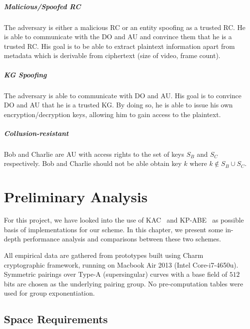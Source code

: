 \documentclass[hyp,a4paper,12pt,openbib]{socreport}
\begin{document}
\paragraph{Malicious/Spoofed RC} The adversary is either a malicious RC or an entity spoofing as a trusted RC. He is able to communicate with the DO and AU and convince them that he is a trusted RC. His goal is to be able to extract plaintext information apart from metadata which is derivable from ciphertext (size of video, frame count). 

\paragraph{KG Spoofing} The adversary is able to communicate with DO and AU. His goal is to convince DO and AU that he is a trusted KG. By doing so, he is able to issue his own encryption/decryption keys, allowing him to gain access to the plaintext.

\paragraph{Collusion-resistant} Bob and Charlie are AU with access rights to the set of keys $S_{B}$ and $S_{C}$ respectively. Bob and Charlie should not be able obtain key $k$ where $k \not\in S_{B} \cup S_{C}$.




\chapter{Preliminary Analysis}
\label{chap:prelim}
For this project, we have looked into the use of KAC~\cite{chu2013key} and KP-ABE~\cite{lewko2010revocation} as possible basis of implementations for our scheme. In this chapter, we present some in-depth performance analysis and comparisons between these two schemes.

All empirical data are gathered from prototypes built using Charm~\cite{charm13} cryptographic framework, running on Macbook Air 2013 (Intel Core-i7-4650u). Symmetric pairings over Type-A (supersingular) curves  with a base field of $512$ bits are chosen as the underlying pairing group. No pre-computation tables were used for group exponentiation.

\section{Space Requirements}
\end{document}
